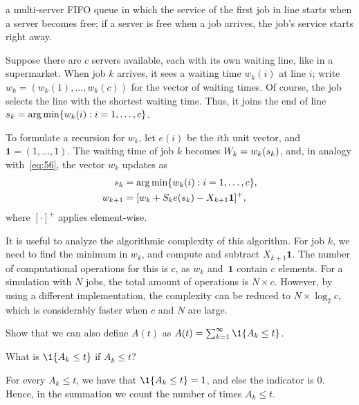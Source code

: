  a multi-server FIFO queue in which the service of the first job in line starts when a server becomes free; if a server is free when a job arrives, the job's service  starts right away.

Suppose there are $c$ servers available, each with its own waiting line, like in a supermarket.
When job $k$ arrives, it sees a waiting time $w_{k}(i)$ at line $i$; write $w_k = (w_{k}(1), \ldots, w_{k}(c))$ for the vector of waiting times.
Of course, the job selects the line with the shortest waiting time.
Thus, it joins the end of line $s_k = \operatorname*{arg\,min}\{w_{k}(i) : i=1,\ldots, c\}$.

To formulate a recursion for $w_{k}$, let $e(i)$ be the $i$th unit vector, and $\mathbf{1} = (1,\ldots, 1)$.
The waiting time of job $k$ becomes $W_k = w_{k}(s_k)$, and, in analogy with~\cref{eq:56}, the vector $w_k$ updates as
\begin{align*}
  s_k &= \operatorname*{arg\,min}\{w_{k}(i) : i=1,\ldots, c\},\\
  w_{k+1} &= [w_k + S_k e(s_k) - X_{k+1}\mathbf{1}]^+,
\end{align*}
where $[\cdot]^+$ applies element-wise.

It is useful to analyze the algorithmic complexity of this algorithm.
For job $k$, we need to find the minimum in $w_k$, and compute and subtract $X_{k+1}\mathbf{1}$.
The number of computational operations for this is $c$, as $w_k$ and~$\mathbf{1}$ contain $c$ elements.
For a simulation with $N$ jobs, the total amount of operations is $N \times c$.
However, by using a different implementation, the complexity can be reduced to $N\times \log_2{c}$, which is considerably faster when $c$ and $N$ are large.



\begin{exercise}\label{ex:20}
Show that we can also define $A(t)$ as $A(t) = \sum_{k=1}^\infty \1{A_k \leq t}$.
\begin{hint}
  What is $\1{A_k \leq t}$ if $A_k \leq t$?
\end{hint}
\begin{solution}
For every $A_k \leq t$, we have that $\1{A_k \leq t} = 1$, and else the indicator is $0$. Hence, in the summation we count the number of times $A_k \leq t$.
\end{solution}
\end{exercise}

